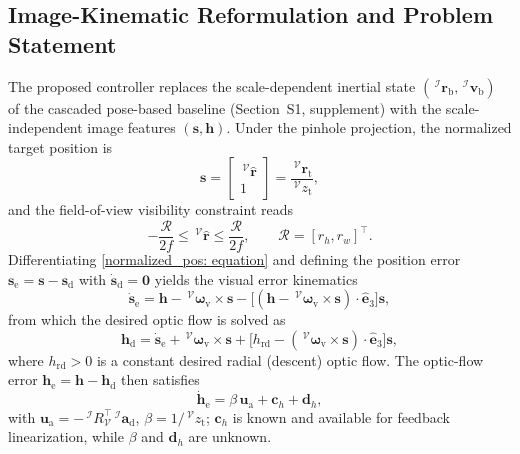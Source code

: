 \subsection{Image-Kinematic Reformulation and Problem Statement} \label{problem statement: section}
The proposed controller replaces the scale-dependent inertial state $(\,^\mathcal{I}\boldsymbol{r}_\text{b},\,^\mathcal{I}\boldsymbol{v}_\text{b})$ of the cascaded pose-based baseline (Section~S1, supplement) with the scale-independent image features $(\boldsymbol{s},\boldsymbol{h})$. Under the pinhole projection, the normalized target position is
\begin{equation} \label{normalized_pos: equation}
    \boldsymbol{s} = \begin{bmatrix}\,^\mathcal{V}\hat{\boldsymbol{r}}\\ 1\end{bmatrix} = \frac{\,^\mathcal{V}\boldsymbol{r}_\text{t}}{\,^\mathcal{V}z_\text{t}},
\end{equation}
and the field-of-view visibility constraint reads
\begin{equation} \label{visibility_constraints}
    -\frac{\mathcal{R}}{2f} \le \,^\mathcal{V}\hat{\boldsymbol{r}} \le \frac{\mathcal{R}}{2f},\qquad \mathcal{R}=[r_h,r_w]^\top.
\end{equation}
Differentiating \eqref{normalized_pos: equation} and defining the position error $\boldsymbol{s}_\text{e}=\boldsymbol{s}-\boldsymbol{s}_\text{d}$ with $\dot{\boldsymbol{s}}_\text{d}=\boldsymbol{0}$ yields the visual error kinematics
\begin{equation} \label{s_e_dot: equation}
    \dot{\boldsymbol{s}}_\text{e} = \boldsymbol{h} - \,^\mathcal{V}\boldsymbol{\omega}_\text{v}\times\boldsymbol{s} - \big[(\boldsymbol{h}-\,^\mathcal{V}\boldsymbol{\omega}_\text{v}\times\boldsymbol{s})\cdot\hat{\boldsymbol{e}}_3\big]\boldsymbol{s},
\end{equation}
from which the desired optic flow is solved as
\begin{equation} \label{h_des: equation}
    \boldsymbol{h}_\text{d} = \dot{\boldsymbol{s}}_\text{e} + \,^\mathcal{V}\boldsymbol{\omega}_\text{v}\times\boldsymbol{s} + \big[h_\text{rd} - (\,^\mathcal{V}\boldsymbol{\omega}_\text{v}\times\boldsymbol{s})\cdot\hat{\boldsymbol{e}}_3\big]\boldsymbol{s},
\end{equation}
where $h_\text{rd}>0$ is a constant desired radial (descent) optic flow. The optic-flow error $\boldsymbol{h}_\text{e}=\boldsymbol{h}-\boldsymbol{h}_\text{d}$ then satisfies
\begin{equation} \label{h_e_dot_1: equation}
    \dot{\boldsymbol{h}}_\text{e} = \beta\,\boldsymbol{u}_\text{a} + \boldsymbol{c}_h + \boldsymbol{d}_h,
\end{equation}
with $\boldsymbol{u}_\text{a}=-\,^\mathcal{I}R_\mathcal{V}^\top\,^\mathcal{I}\boldsymbol{a}_\text{d}$, $\beta=1/\,^\mathcal{V}z_\text{t}$; $\boldsymbol{c}_h$ is known and available for feedback linearization, while $\beta$ and $\boldsymbol{d}_h$ are unknown.

